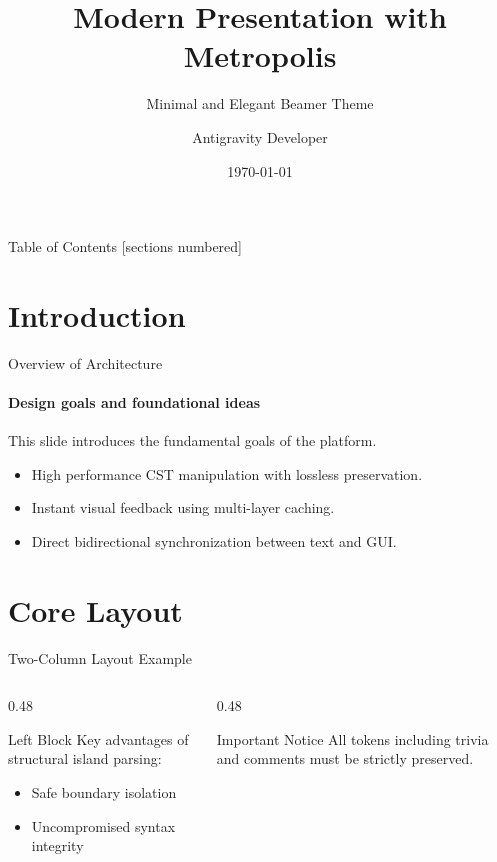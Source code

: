 \documentclass[aspectratio=169]{beamer}
\title{Modern Presentation with Metropolis}
\subtitle{Minimal and Elegant Beamer Theme}
\author{Antigravity Developer}
\institute{Advanced Agentic Institute}
\date{\today}
\begin{document}
\maketitle

\begin{frame}{Table of Contents}
  [sections numbered]
  \tableofcontents[hideallsubsections]
\end{frame}

\section{Introduction}

\begin{frame}[fragile]{Overview of Architecture}
  \framesubtitle{Design goals and foundational ideas}
  This slide introduces the fundamental goals of the platform.

  \begin{itemize}
    \item High performance CST manipulation with lossless preservation.
    \item Instant visual feedback using multi-layer caching.
    \item Direct bidirectional synchronization between text and GUI.
  \end{itemize}
\end{frame}

\section{Core Layout}

\begin{frame}{Two-Column Layout Example}
  \begin{columns}[T]
    \begin{column}{0.48\textwidth}
      \begin{block}{Left Block}
        Key advantages of structural island parsing:
        \begin{itemize}
          \item Safe boundary isolation
          \item Uncompromised syntax integrity
        \end{itemize}
      \end{block}
    \end{column}
    \begin{column}{0.48\textwidth}
      \begin{alertblock}{Important Notice}
        All tokens including trivia and comments must be strictly preserved.
      \end{alertblock}
    \end{column}
  \end{columns}
\end{frame}
\end{document}
